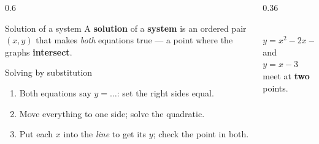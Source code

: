 \documentclass[aspectratio=169, 11pt]{beamer}
\newcommand{\lgrid}[4]{%
  \draw[step=1, linegray!45, thin] (#1,#3) grid (#2,#4);
  \draw[->, thick, charcoal] (#1,0)--(#2,0) node[below right, font=\tiny]{$x$};
  \draw[->, thick, charcoal] (0,#3)--(0,#4) node[left, font=\tiny]{$y$};}
\begin{document}
\begin{frame}[t, plain]
  \begin{columns}[T]
    \begin{column}{0.6\textwidth}
      \begin{block}{Solution of a system}
        A \textbf{solution} of a \textbf{system} is an ordered pair $(x,y)$ that makes
        \emph{both} equations true --- a point where the graphs \textbf{intersect}.
      \end{block}
      \vspace{2pt}
      \begin{block}{Solving by substitution}
        \begin{enumerate}\setlength{\itemsep}{0pt}
          \item Both equations say $y=\ldots$: set the right sides equal.
          \item Move everything to one side; solve the quadratic.
          \item Put each $x$ into the \emph{line} to get its $y$; check the point in both.
        \end{enumerate}
      \end{block}
    \end{column}
    \begin{column}{0.36\textwidth}
      \centering
      \\[-2pt]
      {\scriptsize $y=x^2-2x-3$ and $y=x-3$ \\ meet at \textbf{two} points.}
    \end{column}
  \end{columns}
\end{frame}
\end{document}
